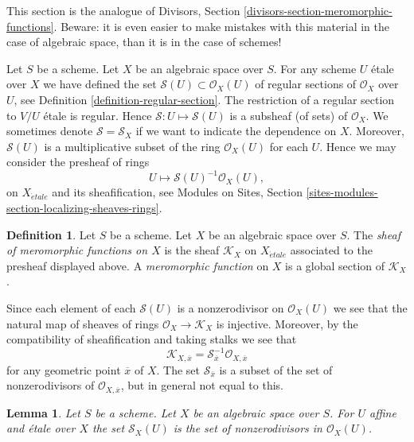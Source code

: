 \documentclass{stacks-project}
\theoremstyle{plain}
\newtheorem{lemma}[subsection]{Lemma}
\theoremstyle{definition}
\newtheorem{definition}[subsection]{Definition}
\theoremstyle{remark}
\numberwithin{equation}{subsection}
\def\etale{{\acute{e}tale}}
\begin{document}
\noindent
This section is the analogue of
Divisors, Section \ref{divisors-section-meromorphic-functions}.
Beware: it is even easier to make mistakes with this material in the
case of algebraic space, than it is in the case of schemes!

\medskip\noindent
Let $S$ be a scheme. Let $X$ be an algebraic space over $S$.
For any scheme $U$ \'etale over $X$ we have defined the set
$\mathcal{S}(U) \subset \mathcal{O}_X(U)$
of regular sections of $\mathcal{O}_X$ over $U$, see
Definition \ref{definition-regular-section}. The restriction
of a regular section to $V/U$ \'etale is regular. Hence
$\mathcal{S} : U \mapsto \mathcal{S}(U)$ is a subsheaf (of sets)
of $\mathcal{O}_X$. We sometimes denote $\mathcal{S} = \mathcal{S}_X$
if we want to indicate the dependence on $X$.
Moreover, $\mathcal{S}(U)$
is a multiplicative subset of the ring $\mathcal{O}_X(U)$ for
each $U$. Hence we may consider
the presheaf of rings
$$
U \longmapsto \mathcal{S}(U)^{-1} \mathcal{O}_X(U),
$$
on $X_\etale$ and its sheafification, see
Modules on Sites, Section \ref{sites-modules-section-localizing-sheaves-rings}.

\begin{definition}
\label{definition-sheaf-meromorphic-functions}
Let $S$ be a scheme. Let $X$ be an algebraic space over $S$.
The {\it sheaf of meromorphic functions on $X$} is
the sheaf {\it $\mathcal{K}_X$} on $X_\etale$ associated to the presheaf
displayed above. A {\it meromorphic function} on $X$
is a global section of $\mathcal{K}_X$.
\end{definition}

\noindent
Since each element of each $\mathcal{S}(U)$ is a nonzerodivisor on
$\mathcal{O}_X(U)$ we see that the natural map of sheaves
of rings $\mathcal{O}_X \to \mathcal{K}_X$ is injective.
Moreover, by the compatibility of sheafification and taking stalks
we see that
$$
\mathcal{K}_{X, \overline{x}} =
\mathcal{S}_{\overline{x}}^{-1}\mathcal{O}_{X, \overline{x}}
$$
for any geometric point $\overline{x}$ of $X$. The set
$\mathcal{S}_{\overline{x}}$ is a subset of
the set of nonzerodivisors of $\mathcal{O}_{X, \overline{x}}$, but
in general not equal to this.

\begin{lemma}
\label{lemma-describe-S}
Let $S$ be a scheme. Let $X$ be an algebraic space over $S$.
For $U$ affine and \'etale over $X$ the set
$\mathcal{S}_X(U)$ is the set of nonzerodivisors in
$\mathcal{O}_X(U)$.
\end{lemma}
\end{document}
